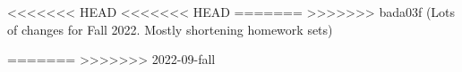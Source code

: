 \documentclass{../../oss-apphys-exam}
\newcounter{lastmc}
\begin{document}
<<<<<<< HEAD
<<<<<<< HEAD
=======
>>>>>>> bada03f (Lots of changes for Fall 2022. Mostly shortening homework sets)

\genfreedirections
=======
>>>>>>> 2022-09-fall

\begin{questions}
  \setcounter{question}{\value{lastmc}}
  



\end{questions}
\end{document}
